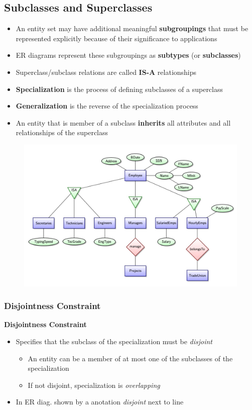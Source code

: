 \subsection{Subclasses and Superclasses}
\begin{itemize}[label=\(\rhd\)]
    \item An entity set may have additional meaningful \textbf{subgroupings} that must be represented explicitly because of their significance to applications
    \item ER diagrams represent these subgroupings as \textbf{subtypes} (or \textbf{subclasses})
    \item Superclass/subclass relations are called \textbf{IS-A} relationships
    \item \textbf{Specialization} is the process of defining subclasses of a superclass
    \item \textbf{Generalization} is the reverse of the specialization process
    \item An entity that is member of a subclass \textbf{inherits} all attributes and all relationships of the superclass
\end{itemize}

\begin{figure}[H]
    \centering
    \includegraphics[width=0.75\linewidth]{images/Screenshot 2024-05-22 at 10.51.13.jpg}
\end{figure}

\subsubsection{Disjointness Constraint}
\textbf{Disjointness Constraint}
\begin{itemize}[label=\(\rhd\)]
    \item Specifies that the subclass of the specialization must be \textit{disjoint}
    \begin{itemize}[label=\(\rhd\)]
        \item An entity can be a member of at most one of the subclasses of the specialization 
        \item If not disjoint, specialization is \textit{overlapping}
    \end{itemize}
    \item In ER diag. shown by a anotation \textit{disjoint} next to line
\end{itemize}
